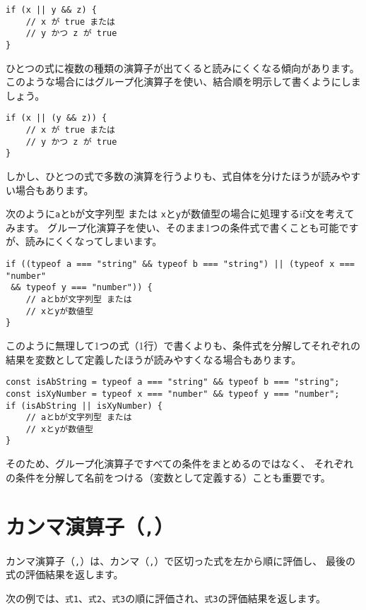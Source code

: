 \begin{lstlisting}
if (x || y && z) {
    // x が true または
    // y かつ z が true
}
\end{lstlisting}

ひとつの式に複数の種類の演算子が出てくると読みにくくなる傾向があります。
このような場合にはグループ化演算子を使い、結合順を明示して書くようにしましょう。

\begin{lstlisting}
if (x || (y && z)) {
    // x が true または
    // y かつ z が true
}
\end{lstlisting}

しかし、ひとつの式で多数の演算を行うよりも、式自体を分けたほうが読みやすい場合もあります。

次のように\texttt{a}と\texttt{b}が文字列型
または
\texttt{x}と\texttt{y}が数値型の場合に処理するif文を考えてみます。
グループ化演算子を使い、そのまま1つの条件式で書くことも可能ですが、読みにくくなってしまいます。

\begin{lstlisting}
if ((typeof a === "string" && typeof b === "string") || (typeof x === "number"
 && typeof y === "number")) {
    // aとbが文字列型 または
    // xとyが数値型
}
\end{lstlisting}

このように無理して1つの式（1行）で書くよりも、条件式を分解してそれぞれの結果を変数として定義したほうが読みやすくなる場合もあります。

\begin{lstlisting}
const isAbString = typeof a === "string" && typeof b === "string";
const isXyNumber = typeof x === "number" && typeof y === "number";
if (isAbString || isXyNumber) {
    // aとbが文字列型 または
    // xとyが数値型
}
\end{lstlisting}

そのため、グループ化演算子ですべての条件をまとめるのではなく、
それぞれの条件を分解して名前をつける（変数として定義する）ことも重要です。

\hypertarget{comma-operator}{%
\section{\texorpdfstring{カンマ演算子（\texttt{,}）}{カンマ演算子（,）}}\label{comma-operator}}

カンマ演算子（\texttt{,}）は、カンマ（\texttt{,}）で区切った式を左から順に評価し、
最後の式の評価結果を返します。

次の例では、\texttt{式1}、\texttt{式2}、\texttt{式3}の順に評価され、\texttt{式3}の評価結果を返します。

